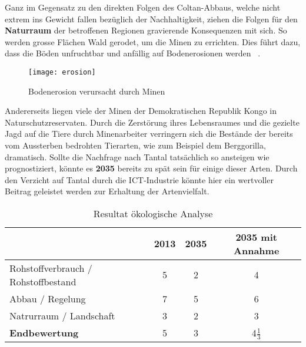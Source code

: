 Ganz im Gegensatz zu den direkten Folgen des Coltan-Abbaus, welche nicht extrem
ins Gewicht fallen bezüglich der Nachhaltigkeit, ziehen die Folgen für den
\textbf{Naturraum} der betroffenen Regionen gravierende Konsequenzen mit sich.
So werden grosse Flächen Wald gerodet, um die Minen zu errichten. Dies führt
dazu, dass die Böden unfruchtbar und anfällig auf Bodenerosionen
werden ~\cite{environmental_management}.

\begin{figure}[h]
\centering
\texttt{[image: erosion]}
\caption{Bodenerosion verursacht durch Minen ~\cite{Coltanmi34:online}}
\label{}
\end{figure}
\pagebreak

Andererseits liegen viele der Minen der Demokratischen Republik Kongo in
Naturschutzreservaten. Durch die Zerstörung ihres Lebensraumes und die gezielte
Jagd auf die Tiere durch Minenarbeiter verringern sich die Bestände der bereits
vom Aussterben bedrohten Tierarten, wie zum Beispiel dem Berggorilla, dramatisch.
Sollte die Nachfrage nach Tantal tatsächlich so ansteigen wie prognostiziert,
könnte es \textbf{2035} bereits zu spät sein für einige dieser Arten.
Durch den Verzicht auf Tantal durch die ICT-Industrie könnte hier ein wertvoller
Beitrag geleistet werden zur Erhaltung der Artenvielfalt.

\begin{table}[h]
  \centering
  \begin{tabular}{l|ccc}                                    & \textbf{2013} & \textbf{2035} & \textbf{2035 mit Annahme}
    \\ \hline Rohstoffverbrauch / Rohstoffbestand                 & 5             & 2             & 4 
    \\ Abbau / Regelung                                           & 7             & 5             & 6
    \\ Natrurraum / Landschaft                                    & 3             & 2             & 3
    \\ \hline \textbf{Endbewertung}                               & 5             & 3             & 4\(\frac{1}{3}\)
  \end{tabular}
  \caption{Resultat ökologische Analyse}
\end{table}
